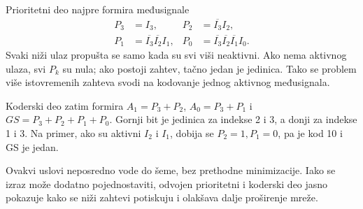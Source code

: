 
Prioritetni deo najpre formira međusignale
\[
\begin{aligned}
 P_3&=I_3, &P_2&=\overline{I_3}I_2,\\
 P_1&=\overline{I_3}\overline{I_2}I_1,
 &P_0&=\overline{I_3}\overline{I_2}\overline{I_1}I_0.
\end{aligned}
\]
Svaki niži ulaz propušta se samo kada su svi viši neaktivni. Ako nema aktivnog ulaza, svi \(P_k\) su nula; ako postoji zahtev, tačno jedan je jedinica. Tako se problem više istovremenih zahteva svodi na kodovanje jednog aktivnog međusignala.

Koderski deo zatim formira \(A_1=P_3+P_2\), \(A_0=P_3+P_1\) i \(GS=P_3+P_2+P_1+P_0\). Gornji bit je jedinica za indekse 2 i 3, a donji za indekse 1 i 3. Na primer, ako su aktivni \(I_2\) i \(I_1\), dobija se \(P_2=1,P_1=0\), pa je kod 10 i GS je jedan.

Ovakvi uslovi neposredno vode do šeme, bez prethodne minimizacije. Iako se izraz može dodatno pojednostaviti, odvojen prioritetni i koderski deo jasno pokazuje kako se niži zahtevi potiskuju i olakšava dalje proširenje mreže.
